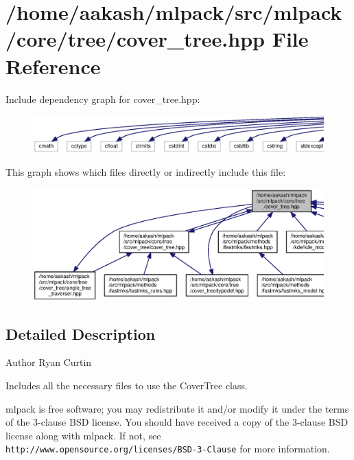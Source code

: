 \section{/home/aakash/mlpack/src/mlpack/core/tree/cover\+\_\+tree.hpp File Reference}
\label{cover__tree_8hpp}
Include dependency graph for cover\+\_\+tree.\+hpp\+:
\nopagebreak
\begin{figure}[H]
\begin{center}
\leavevmode
\includegraphics[width=350pt]{cover__tree_8hpp__incl}
\end{center}
\end{figure}
This graph shows which files directly or indirectly include this file\+:
\nopagebreak
\begin{figure}[H]
\begin{center}
\leavevmode
\includegraphics[width=350pt]{cover__tree_8hpp__dep__incl}
\end{center}
\end{figure}


\subsection{Detailed Description}
\begin{DoxyAuthor}{Author}
Ryan Curtin
\end{DoxyAuthor}
Includes all the necessary files to use the Cover\+Tree class.

mlpack is free software; you may redistribute it and/or modify it under the terms of the 3-\/clause B\+SD license. You should have received a copy of the 3-\/clause B\+SD license along with mlpack. If not, see {\tt http\+://www.\+opensource.\+org/licenses/\+B\+S\+D-\/3-\/\+Clause} for more information. 